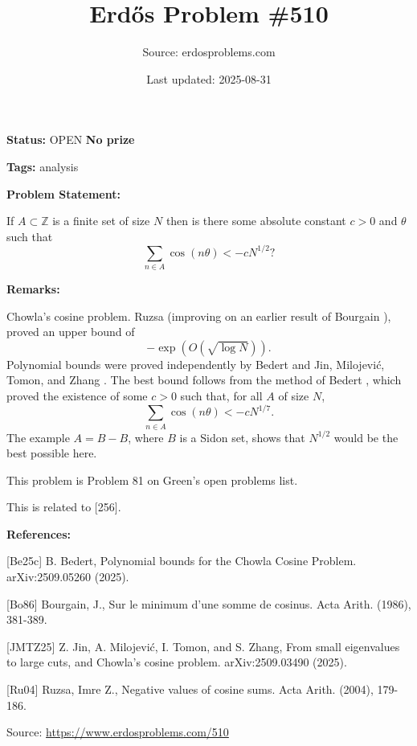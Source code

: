 \documentclass{article}
\title{Erd\H{o}s Problem \#510}
\date{Last updated: 2025-08-31}
\author{Source: erdosproblems.com}
\begin{document}
\maketitle

\noindent\textbf{Status:} OPEN \quad \textbf{No prize}

\noindent\textbf{Tags:} analysis

\medskip
\noindent\textbf{Problem Statement:}

If $A\subset \mathbb{Z}$ is a finite set of size $N$ then is there some absolute constant $c>0$ and $\theta$ such that\[\sum_{n\in A}\cos(n\theta) < -cN^{1/2}?\]

\bigskip
\noindent\textbf{Remarks:}

Chowla's cosine problem. Ruzsa \cite{Ru04} (improving on an earlier result of Bourgain \cite{Bo86}), proved an upper bound of\[-\exp(O(\sqrt{\log N})).\]Polynomial bounds were proved independently by Bedert \cite{Be25c} and Jin, Milojevi\'{c}, Tomon, and Zhang \cite{JMTZ25}. The best bound follows from the method of Bedert \cite{Be25c}, which proved the existence of some $c>0$ such that, for all $A$ of size $N$,\[\sum_{n\in A}\cos(n\theta) < -cN^{1/7}.\]The example $A=B-B$, where $B$ is a Sidon set, shows that $N^{1/2}$ would be the best possible here.

This problem is Problem 81 on Green's open problems list.

This is related to [256].

\bigskip
\noindent\textbf{References:}

[Be25c] B. Bedert, Polynomial bounds for the Chowla Cosine Problem. arXiv:2509.05260 (2025).
 
 [Bo86] Bourgain, J., Sur le minimum d'une somme de cosinus. Acta Arith. (1986), 381-389.
 
 [JMTZ25] Z. Jin, A. Milojevi\'{c}, I. Tomon, and S. Zhang, From small eigenvalues to large cuts, and Chowla's cosine problem. arXiv:2509.03490 (2025).
 
 [Ru04] Ruzsa, Imre Z., Negative values of cosine sums. Acta Arith. (2004), 179-186.

\bigskip
\noindent\small{Source: \url{https://www.erdosproblems.com/510}}
\end{document}
